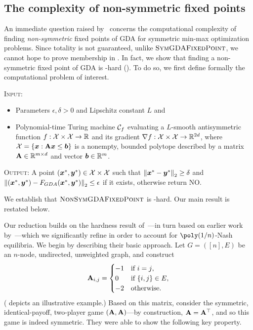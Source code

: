 \subsection{The complexity of non-symmetric fixed points}
\label{sec:nonsymmetric}

An immediate question raised by~ concerns the computational complexity of finding \emph{non-symmetric} fixed points of GDA for symmetric min-max optimization problems. Since totality is not guaranteed, unlike $\textsc{SymGDAFixedPoint}$, we cannot hope to prove membership in \PPAD. In fact, we show that finding a non-symmetric fixed point of GDA is \FNP-hard (). To do so, we first define formally the computational problem of interest.

\begin{nproblem}[\nsymgdaFixed]
 \textsc{Input:}  \begin{itemize}
   \item Parameters $\epsilon,\delta>0$ and Lipschitz constant $L$ and
  \item Polynomial-time Turing
  machine $\mathcal{C}_f$ evaluating a $L$-smooth antisymmetric function $f : \mathcal{X} \times \mathcal{X} \to \mathbb{R}$ and its gradient
  $\nabla f: \mathcal{X}\times \mathcal{X} \to \mathbb{R}^{2d}$, where
  $\mathcal{X} = \{{\bm{x}}:\mathbf{A} {\bm{x}} \leq \bm{b}\}$ is a nonempty, bounded polytope described by a matrix
  $\mathbf{A} \in \mathbb{R}^{m \times d}$ and vector $\bm{b} \in \mathbb{R}^{m}$.
\end{itemize}

  \noindent \textsc{Output:} A point
  $({\bm{x}}^*,{\bm{y}}^*)\in \mathcal{X}\times\mathcal{X}$ such that $\left\| {\bm{x}}^*-{\bm{y}}^* \right\|_2 \geq \delta$ and
  $\left\| ({\bm{x}}^*, {\bm{y}}^*) - F_{GDA}({\bm{x}}^*,{\bm{y}}^*) \right\|_2 \leq \epsilon$ if it exists, otherwise return \textsf{NO}.
\end{nproblem}

\noindent We establish that $\textsc{NonSymGDAFixedPoint}$ is \FNP-hard. Our main result is restated below.

\nonsymmetric*

Our reduction builds on the hardness result of~\citet{MCLENNAN2010683}---in turn based on earlier work by~\citet{gilboa1989nash,Conitzer08:New}---which we significantly refine in order to account for $\poly(1/n)$-Nash equilibria. We begin by describing their basic approach. Let $G = ([n], E)$ be an $n$-node, undirected, unweighted graph, and construct
\begin{equation}
    \label{eq:matA}
    \mathbf{A}_{i, j} = 
    \begin{cases}
        -1 & \text{if $i = j$}, \\
        0 & \text{if $\{i, j\} \in E$}, \\
        -2 & \text{otherwise.}
    \end{cases}
\end{equation}
( depicts an illustrative example.) Based on this matrix, \citet{MCLENNAN2010683} consider the symmetric, identical-payoff, two-player game $(\mathbf{A}, \mathbf{A})$---by construction, $\mathbf{A} = \mathbf{A}^\top$, and so this game is indeed symmetric. They were able to show the following key property.


